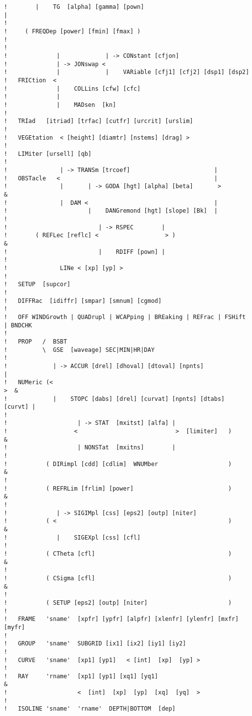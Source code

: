 \documentclass[12pt]{book}
\begin{document}
\begin{verbatim}
!        |    TG  [alpha] [gamma] [pown]                               |
!
!     ( FREQDep [power] [fmin] [fmax] )
!
!
!              |             | -> CONstant [cfjon]
!              | -> JONswap <
!              |             |    VARiable [cfj1] [cfj2] [dsp1] [dsp2]
!   FRICtion  <
!              |    COLLins [cfw] [cfc]
!              |
!              |    MADsen  [kn]
!
!   TRIad   [itriad] [trfac] [cutfr] [urcrit] [urslim]
!
!   VEGEtation  < [height] [diamtr] [nstems] [drag] >
!
!   LIMiter [ursell] [qb]
!
!               | -> TRANSm [trcoef]                        |
!   OBSTacle   <                                            |
!               |       | -> GODA [hgt] [alpha] [beta]       >              &
!               |  DAM <                                    |
!                       |    DANGremond [hgt] [slope] [Bk]  |
!
!                          | -> RSPEC        |
!        ( REFLec [reflc] <                   > )                           &
!                          |    RDIFF [pown] |
!
!               LINe < [xp] [yp] >
!
!   SETUP  [supcor]
!
!   DIFFRac  [idiffr] [smpar] [smnum] [cgmod]
!
!   OFF WINDGrowth | QUADrupl | WCAPping | BREaking | REFrac | FSHift | BNDCHK
!
!   PROP   /  BSBT
!          \  GSE  [waveage] SEC|MIN|HR|DAY
!
!             | -> ACCUR [drel] [dhoval] [dtoval] [npnts]               |
!   NUMeric (<                                                           >  &
!             |    STOPC [dabs] [drel] [curvat] [npnts] [dtabs] [curvt] |
!
!                    | -> STAT  [mxitst] [alfa] |
!                   <                            >  [limiter]   )           &
!                    | NONSTat  [mxitns]        |
!
!           ( DIRimpl [cdd] [cdlim]  WNUMber                    )           &
!
!           ( REFRLim [frlim] [power]                           )           &
!
!              | -> SIGIMpl [css] [eps2] [outp] [niter]
!           ( <                                                 )           &
!              |    SIGEXpl [css] [cfl]
!
!           ( CTheta [cfl]                                      )           &
!
!           ( CSigma [cfl]                                      )           &
!
!           ( SETUP [eps2] [outp] [niter]                       )
!
!   FRAME   'sname'  [xpfr] [ypfr] [alpfr] [xlenfr] [ylenfr] [mxfr] [myfr]
!
!   GROUP   'sname'  SUBGRID [ix1] [ix2] [iy1] [iy2]
!
!   CURVE   'sname'  [xp1] [yp1]   < [int]  [xp]  [yp] >
!
!   RAY     'rname'  [xp1] [yp1] [xq1] [yq1]                                &
!                    <  [int]  [xp]  [yp]  [xq]  [yq]  >
!
!   ISOLINE 'sname'  'rname'  DEPTH|BOTTOM  [dep]

\end{verbatim}
\end{document}
